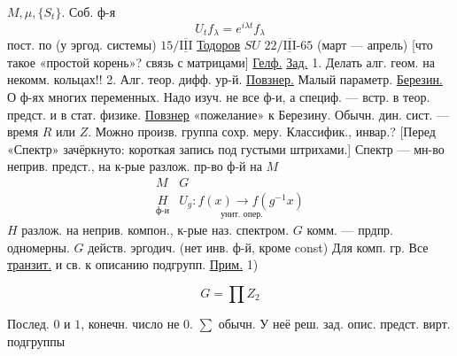 $M,\mu,\{S_t\}$.
Соб. ф-я
\begin{equation*}
U_t f_\lambda=e^{i\lambda t}f_\lambda
\end{equation*}
пост. по  (у эргод. системы)
$15/\overline{\underline{\mathrm{III}}}$ \underline{Тодоров} $SU$
$22/\overline{\underline{\mathrm{III}}}$-$65$ 
(март --- апрель)
[что такое «простой корень»? связь с матрицами]
\underline{Гелф.} \underline{Зад.}
1. Делать алг. геом. на некомм. кольцах!!
2. Алг. теор. дифф. ур-й.
\underline{Повзнер.} Малый параметр.
\underline{Березин.} О ф-ях многих переменных.
Надо изуч. не все ф-и, а специф. --- встр. в теор. предст. и
в стат. физике.
\underline{Повзнер} «пожелание» к Березину.
Обычн. дин. сист. --- время $R$ или $Z$. Можно
произв. группа сохр. меру. Классифик., инвар.?
[Перед «Спектр» зачёркнуто: короткая запись под густыми штрихами.]
Спектр --- мн-во неприв. предст., на к-рые
разлож. пр-во ф-й на $M$
\begin{equation*}
\begin{array}{ll}
M&G\\
\underset{\text{ф-и}}{H}&\underset{\text{унит. опер.}}{U_g:f(x)\longrightarrow f(g^{-1}x)}
\end{array}
\end{equation*}
$H$ разлож. на неприв. компон., к-рые наз. спектром.
$G$ комм. --- прдпр. одномерны.
$G$ действ. эргодич. (нет инв. ф-й, кроме const)
Для комп. гр. Все \underline{транзит.} и св. к описанию
подгрупп.
\underline{Прим.} 1) 
\par\noindent\begin{minipage}{\linewidth}
\begin{equation*}
G=\prod Z_2
\end{equation*}
\end{minipage}\par
{}
Послед. $0$ и $1$, конечн. число не $0$.
$\sum$ обычн.
У неё реш. зад. опис. предст. вирт. подгруппы

